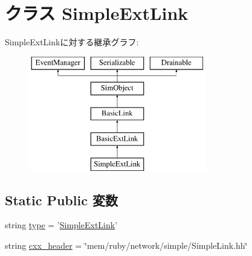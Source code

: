 \hypertarget{classSimpleLink_1_1SimpleExtLink}{
\section{クラス SimpleExtLink}
\label{classSimpleLink_1_1SimpleExtLink}
}
SimpleExtLinkに対する継承グラフ:\begin{figure}[H]
\begin{center}
\leavevmode
\includegraphics[height=5cm]{classSimpleLink_1_1SimpleExtLink}
\end{center}
\end{figure}
\subsection*{Static Public 変数}
\begin{DoxyCompactItemize}
\item 
string \hyperlink{classSimpleLink_1_1SimpleExtLink_acce15679d830831b0bbe8ebc2a60b2ca}{type} = '\hyperlink{classSimpleLink_1_1SimpleExtLink}{SimpleExtLink}'
\item 
string \hyperlink{classSimpleLink_1_1SimpleExtLink_a17da7064bc5c518791f0c891eff05fda}{cxx\_\-header} = \char`\"{}mem/ruby/network/simple/SimpleLink.hh\char`\"{}
\end{DoxyCompactItemize}



